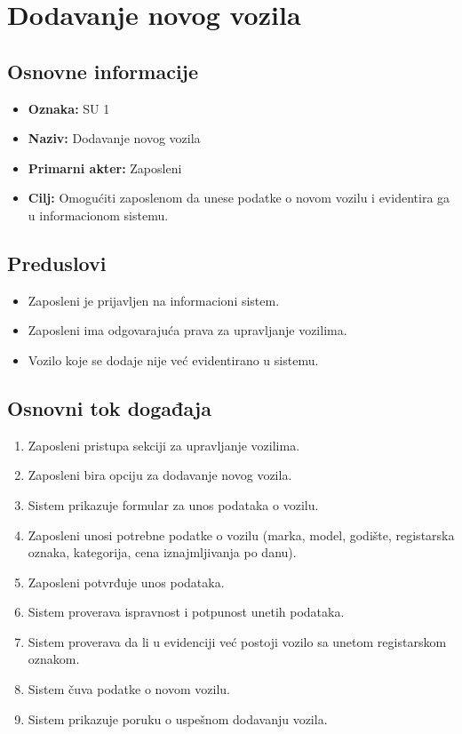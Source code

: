 \section{Dodavanje novog vozila}

\subsection{Osnovne informacije}

\begin{itemize}
    \item \textbf{Oznaka:} SU 1
    \item \textbf{Naziv:} Dodavanje novog vozila
    \item \textbf{Primarni akter:} Zaposleni
    \item \textbf{Cilj:} Omogućiti zaposlenom da unese podatke o novom vozilu i evidentira ga u informacionom sistemu.
\end{itemize}

\subsection{Preduslovi}

\begin{itemize}
    \item Zaposleni je prijavljen na informacioni sistem.
    \item Zaposleni ima odgovarajuća prava za upravljanje vozilima.
    \item Vozilo koje se dodaje nije već evidentirano u sistemu.
\end{itemize}

\subsection{Osnovni tok događaja}

\begin{enumerate}
    \item Zaposleni pristupa sekciji za upravljanje vozilima.
    \item Zaposleni bira opciju za dodavanje novog vozila.
    \item Sistem prikazuje formular za unos podataka o vozilu.
    \item Zaposleni unosi potrebne podatke o vozilu (marka, model, godište, registarska oznaka, kategorija, cena iznajmljivanja po danu).
    \item Zaposleni potvrđuje unos podataka.
    \item Sistem proverava ispravnost i potpunost unetih podataka.
    \item Sistem proverava da li u evidenciji već postoji vozilo sa unetom registarskom oznakom.
    \item Sistem čuva podatke o novom vozilu.
    \item Sistem prikazuje poruku o uspešnom dodavanju vozila.
\end{enumerate}


